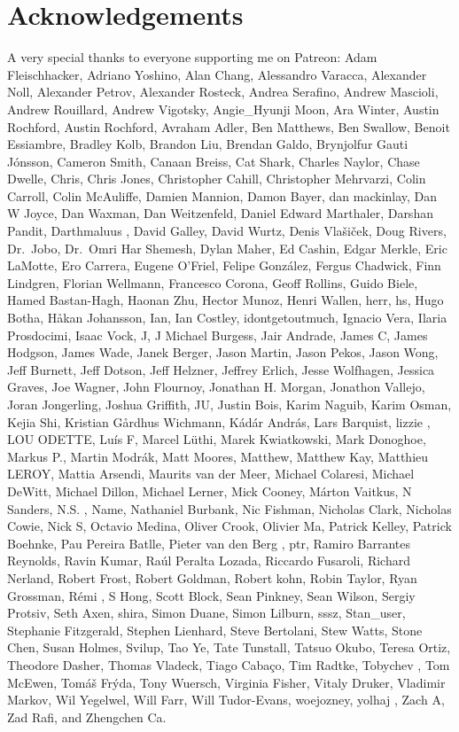 \documentclass[
  letterpaper,
  DIV=11,
  numbers=noendperiod]{scrartcl}
\begin{document}
\section*{Acknowledgements}\label{acknowledgements}

A very special thanks to everyone supporting me on Patreon: Adam
Fleischhacker, Adriano Yoshino, Alan Chang, Alessandro Varacca,
Alexander Noll, Alexander Petrov, Alexander Rosteck, Andrea Serafino,
Andrew Mascioli, Andrew Rouillard, Andrew Vigotsky, Angie\_Hyunji Moon,
Ara Winter, Austin Rochford, Austin Rochford, Avraham Adler, Ben
Matthews, Ben Swallow, Benoit Essiambre, Bradley Kolb, Brandon Liu,
Brendan Galdo, Brynjolfur Gauti Jónsson, Cameron Smith, Canaan Breiss,
Cat Shark, Charles Naylor, Chase Dwelle, Chris, Chris Jones, Christopher
Cahill, Christopher Mehrvarzi, Colin Carroll, Colin McAuliffe, Damien
Mannion, Damon Bayer, dan mackinlay, Dan W Joyce, Dan Waxman, Dan
Weitzenfeld, Daniel Edward Marthaler, Darshan Pandit, Darthmaluus ,
David Galley, David Wurtz, Denis Vlašiček, Doug Rivers, Dr.~Jobo,
Dr.~Omri Har Shemesh, Dylan Maher, Ed Cashin, Edgar Merkle, Eric
LaMotte, Ero Carrera, Eugene O'Friel, Felipe González, Fergus Chadwick,
Finn Lindgren, Florian Wellmann, Francesco Corona, Geoff Rollins, Guido
Biele, Hamed Bastan-Hagh, Haonan Zhu, Hector Munoz, Henri Wallen, herr,
hs, Hugo Botha, Håkan Johansson, Ian, Ian Costley, idontgetoutmuch,
Ignacio Vera, Ilaria Prosdocimi, Isaac Vock, J, J Michael Burgess, Jair
Andrade, James C, James Hodgson, James Wade, Janek Berger, Jason Martin,
Jason Pekos, Jason Wong, Jeff Burnett, Jeff Dotson, Jeff Helzner,
Jeffrey Erlich, Jesse Wolfhagen, Jessica Graves, Joe Wagner, John
Flournoy, Jonathan H. Morgan, Jonathon Vallejo, Joran Jongerling, Joshua
Griffith, JU, Justin Bois, Karim Naguib, Karim Osman, Kejia Shi,
Kristian Gårdhus Wichmann, Kádár András, Lars Barquist, lizzie , LOU
ODETTE, Luís F, Marcel Lüthi, Marek Kwiatkowski, Mark Donoghoe, Markus
P., Martin Modrák, Matt Moores, Matthew, Matthew Kay, Matthieu LEROY,
Mattia Arsendi, Maurits van der Meer, Michael Colaresi, Michael DeWitt,
Michael Dillon, Michael Lerner, Mick Cooney, Márton Vaitkus, N Sanders,
N.S. , Name, Nathaniel Burbank, Nic Fishman, Nicholas Clark, Nicholas
Cowie, Nick S, Octavio Medina, Oliver Crook, Olivier Ma, Patrick Kelley,
Patrick Boehnke, Pau Pereira Batlle, Pieter van den Berg , ptr, Ramiro
Barrantes Reynolds, Ravin Kumar, Raúl Peralta Lozada, Riccardo Fusaroli,
Richard Nerland, Robert Frost, Robert Goldman, Robert kohn, Robin
Taylor, Ryan Grossman, Rémi , S Hong, Scott Block, Sean Pinkney, Sean
Wilson, Sergiy Protsiv, Seth Axen, shira, Simon Duane, Simon Lilburn,
sssz, Stan\_user, Stephanie Fitzgerald, Stephen Lienhard, Steve
Bertolani, Stew Watts, Stone Chen, Susan Holmes, Svilup, Tao Ye, Tate
Tunstall, Tatsuo Okubo, Teresa Ortiz, Theodore Dasher, Thomas Vladeck,
Tiago Cabaço, Tim Radtke, Tobychev , Tom McEwen, Tomáš Frýda, Tony
Wuersch, Virginia Fisher, Vitaly Druker, Vladimir Markov, Wil Yegelwel,
Will Farr, Will Tudor-Evans, woejozney, yolhaj , Zach A, Zad Rafi, and
Zhengchen Ca.
\end{document}
